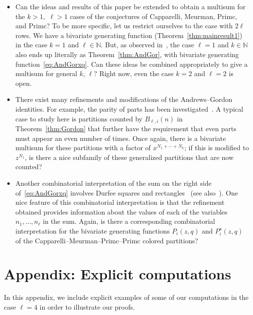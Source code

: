 \documentclass[pdftex]{sigma}
\numberwithin{equation}{section}
\theoremstyle{definition}
\newcommand{\NN}{\mathbb{N}}
\begin{document}
\begin{itemize}\itemsep=0pt
\item Can the ideas and results of this paper be extended to obtain a multisum for the $k>1,$ $\ell>1$ cases of the conjectures of Capparelli, Meurman, Primc, and Primc? To be more specific, let us restrict ourselves to the case with $2\ell$ rows. We have a bivariate generating function (Theorem~\ref{thm:mainresult1}) in the case $k=1$ and $\ell \in \NN$. But, as observed in~\cite{CMPP}, the case $\ell=1$ and $k\in\NN$ also ends up literally as Theorem~\ref{thm:AndGor}, with bivariate generating function~\eqref{eq:AndGorxq}. Can these ideas be combined appropriately to give a multisum for general $k$, $\ell$? Right now, even the case $k=2$ and $\ell=2$ is open.

\item There exist many refinements and modifications of the Andrews--Gordon identities. For example, the parity of parts has been investigated~\cite{AndParity,KimYee,KurThesis,KurParity}. A typical case to study here is partitions counted by $B_{\ell,i}(n)$ in Theorem~\ref{thm:Gordon} that further have the requirement that even parts must appear an even number of times. Once again, there is a bivariate multisum for these partitions with a factor of $x^{N_1+\cdots+N_k}$; if this is modified to $z^{N_1}$, is there a nice subfamily of these generalized partitions that are now counted?

\item Another combinatorial interpretation of the sum on the right side of~\eqref{eq:AndGorxq} involves Durfee squares and rectangles~\cite{AndDurf} (see also~\cite{ADJM}). One nice feature of this combinatorial interpretation is that the refinement obtained provides information about the values of each of the variables $n_1,\dots,n_\ell$ in the sum. Again, is there a corresponding combinatorial interpretation for the bivariate generating functions $P_i(z,q)$ and $P_i^\star(z,q)$ of the Capparelli--Meurman--Primc--Primc colored partitions?
\end{itemize}


\appendix

\section{Appendix: Explicit computations}\label{sec:appendix}
In this appendix, we include explicit examples of some of our computations in the case $\ell=4$ in order to illustrate our proofs.
\end{document}
